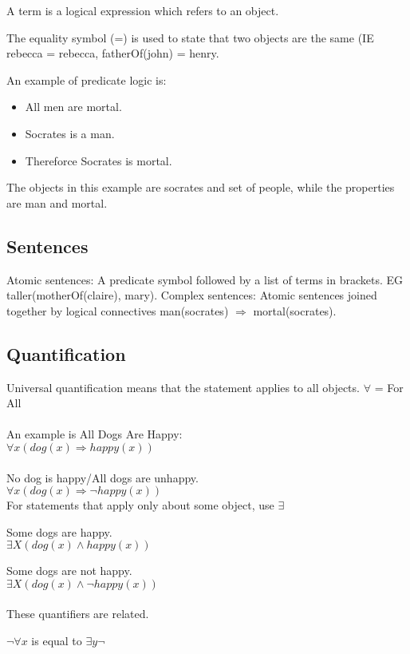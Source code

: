\documentclass[11pt, oneside]{article}   	%
\begin{document}
A term is a logical expression which refers to an object.

The equality symbol (=) is used to state that two objects are the same (IE rebecca = rebecca, fatherOf(john) = henry.

An example of predicate logic is:
\begin{itemize}
\item All men are mortal.
\item Socrates is a man.
\item Thereforce Socrates is mortal.
\end{itemize}
The objects in this example are socrates and set of people, while the properties are man and mortal. 

\subsection{Sentences}

Atomic sentences: A predicate symbol followed by a list of terms in brackets. EG taller(motherOf(claire), mary).
Complex sentences: Atomic sentences joined together by logical connectives man(socrates) $\Rightarrow$ mortal(socrates).

\subsection{Quantification}
Universal quantification means that the statement applies to all objects. 
$\forall$ = For All
\\\\
An example is All Dogs Are Happy:\\
$\forall x (dog(x) \Rightarrow happy(x))$\\\\
No dog is happy/All dogs are unhappy.\\
$\forall x (dog(x) \Rightarrow \neg happy(x))$\\

For statements that apply only about some object, use $\exists$

Some dogs are happy.\\
$\exists X (dog(x) \wedge happy(x))$

Some dogs are not happy.\\
$\exists X (dog(x) \wedge \neg happy(x))$\\\\

These quantifiers are related.

$\neg \forall x$ is equal to $\exists y \neg$\\
\end{document}
